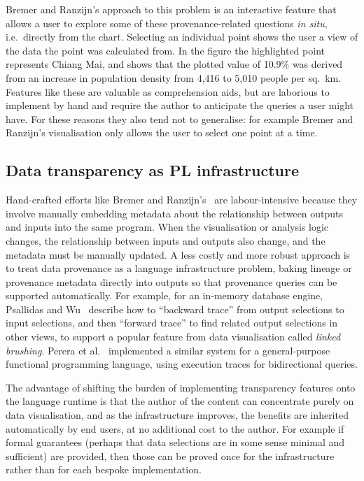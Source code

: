 Bremer and Ranzijn's \cite{bremer15} approach to this problem is an interactive feature that allows a user to
explore some of these provenance-related questions \emph{in situ}, i.e.~directly from the chart. Selecting an
individual point shows the user a view of the data the point was calculated from. In the figure the
highlighted point represents Chiang Mai, and shows that the plotted value of 10.9\% was derived from an
increase in population density from 4,416 to 5,010 people per sq.~km. Features like these are valuable as
comprehension aids, but are laborious to implement by hand and require the author to anticipate the queries a
user might have. For these reasons they also tend not to generalise: for example Bremer and Ranzijn's
\cite{bremer15} visualisation only allows the user to select one point at a time.

\subsection{Data transparency as PL infrastructure}
\label{sec:introduction:data-transparency}

Hand-crafted efforts like Bremer and Ranzijn's~\cite{bremer15} are labour-intensive because they involve
manually embedding metadata about the relationship between outputs and inputs into the same program. When the
visualisation or analysis logic changes, the relationship between inputs and outputs also change, and the
metadata must be manually updated. A less costly and more robust approach is to treat data provenance as a
language infrastructure problem, baking lineage or provenance metadata directly into outputs so that
provenance queries can be supported automatically. For example, for an in-memory database engine, Psallidas
and Wu~\cite{psallidas18b} describe how to ``backward trace'' from output selections to input selections, and
then ``forward trace'' to find related output selections in other views, to support a popular feature from
data visualisation called \emph{linked brushing}. Perera et al.~\cite{perera22} implemented a similar system
for a general-purpose functional programming language, using execution traces for bidirectional queries.

The advantage of shifting the burden of implementing transparency features onto the language runtime is that
the author of the content can concentrate purely on data visualisation, and as the infrastructure improves,
the benefits are inherited automatically by end users, at no additional cost to the author. For example if
formal guarantees (perhaps that data selections are in some sense minimal and sufficient) are provided, then
those can be proved once for the infrastructure rather than for each bespoke implementation.

